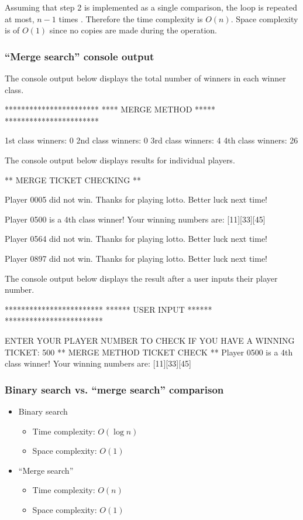 Assuming that step 2 is implemented as a single comparison, the loop is repeated at most, $n - 1$ times \citep[p. 48 - 49]{Watt2001}. Therefore the time complexity is $O(n)$. Space complexity is of $O(1)$ since no copies are made during the operation.

\subsubsection{``Merge search'' console output}

The console output below displays the total number of winners in each winner class.
\\
\begin{consolecode}
***********************
**** MERGE METHOD *****
***********************

1st class winners: 0
2nd class winners: 0
3rd class winners: 4
4th class winners: 26
\end{consolecode}

\noindent
The console output below displays results for individual players.
\\
\begin{consolecode}
** MERGE TICKET CHECKING **

Player 0005 did not win. Thanks for playing lotto. 
Better luck next time!

Player 0500 is a 4th class winner!
Your winning numbers are: [11][33][45]

Player 0564 did not win. Thanks for playing lotto. 
Better luck next time!

Player 0897 did not win. Thanks for playing lotto. 
Better luck next time!
\end{consolecode}

\noindent
The console output below displays the result after a user inputs their player number.
\\
\begin{consolecode}
************************
****** USER INPUT ******
************************

ENTER YOUR PLAYER NUMBER TO CHECK IF YOU HAVE A WINNING TICKET:
500
** MERGE METHOD TICKET CHECK **
Player 0500 is a 4th class winner!
Your winning numbers are: [11][33][45]
\end{consolecode}

\newpage
\subsubsection{Binary search vs. ``merge search'' comparison}

\begin{itemize}
\item Binary search
	\begin{itemize}
	\item Time complexity: $O(\log n)$
	\item Space complexity: $O(1)$
	\end{itemize}
\item ``Merge search''
	\begin{itemize}
	\item Time complexity: $O(n)$
	\item Space complexity: $O(1)$
	\end{itemize}
\end{itemize}